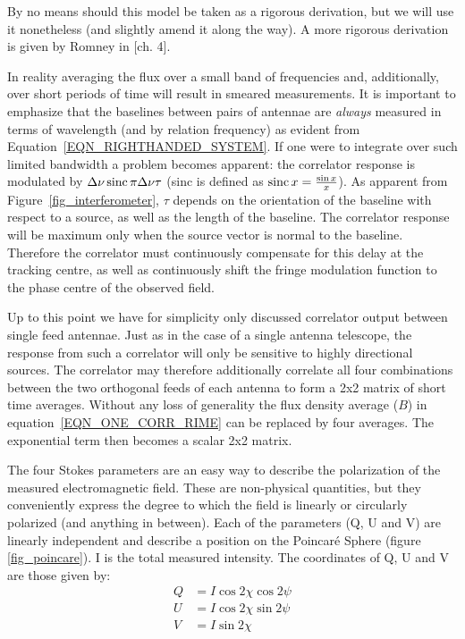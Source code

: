 By no means should this model be taken as a rigorous derivation, but we will use it nonetheless (and slightly amend it 
along the way). A more rigorous derivation is given by Romney in \cite{taylor1999synthesis}[ch. 4].

In reality averaging the flux over a small band of frequencies and, additionally, over short periods of 
time will result in smeared measurements. It is important to emphasize that the baselines between pairs of antennae are 
\textit{always} measured in terms of wavelength (and by relation frequency) as evident from Equation~\ref{EQN_RIGHTHANDED_SYSTEM}.
If one were to integrate over such limited bandwidth a problem becomes apparent: the correlator response
is modulated by $\Delta\nu\operatorname*{sinc}{\pi\Delta\nu\tau}$ (sinc is defined as $\operatorname*{sinc}{x} = \frac{\sin{x}}{x}$). As apparent from
Figure~\ref{fig_interferometer}, $\tau$ depends on the orientation of the baseline with respect to a source, as well as the length of the 
baseline. The correlator response will be maximum only when the source vector is normal to the baseline. Therefore the 
correlator must continuously compensate for this delay at the tracking centre, as well as continuously shift the fringe modulation 
function to the phase centre of the observed field.

Up to this point we have for simplicity only discussed correlator output between single feed antennae.
Just as in the case of a single antenna telescope, the response from such a correlator will only be sensitive to highly 
directional sources. The correlator may therefore additionally correlate all four combinations between the two orthogonal 
feeds of each antenna to form a 2x2 matrix of short time averages. Without any loss of generality the flux density 
average ($B$) in equation~\ref{EQN_ONE_CORR_RIME} can be replaced by four averages. The exponential term 
then becomes a scalar 2x2 matrix.

The four Stokes parameters are an easy way to describe the polarization of the measured electromagnetic field. These 
are non-physical quantities, but they conveniently express the degree to which the field is linearly or circularly polarized
(and anything in between). Each of the parameters (Q, U and V) are linearly independent and describe a position on the 
Poincar\'e Sphere (figure \ref{fig_poincare}). I is the total measured intensity. The coordinates of Q, U and V are
those given by:
\begin{equation}
\begin{split}
Q &= I\cos{2\chi}\cos{2\psi}\\
U &= I\cos{2\chi}\sin{2\psi}\\
V &= I\sin{2\chi}\\
\end{split}
\end{equation}

